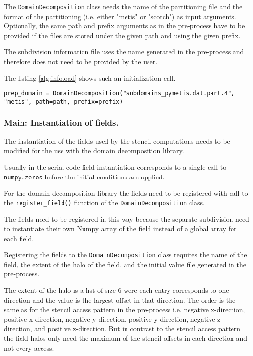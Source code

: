 The \texttt{DomainDecomposition} class needs the name of the partitioning file and the format of the partitioning (i.e. either "metis" or "scotch") as input arguments.
Optionally, the same path and prefix arguments as in the pre-process have to be provided if the files are stored under the given path and using the given prefix.

The subdivision information file uses the name generated in the pre-process and therefore does not need to be provided by the user.

The listing \ref{alg:infoload} shows such an initialization call.

\begin{lstlisting}[caption={Example code for the loading of the domain decomposition information.},captionpos=b, label={alg:infoload}]
prep_domain = DomainDecomposition("subdomains_pymetis.dat.part.4", "metis", path=path, prefix=prefix)
\end{lstlisting}

\subsubsection{Main: Instantiation of fields.}
The instantiation of the fields used by the stencil computations needs to be modified for the use with the domain decomposition library.

Usually in the serial code field instantiation corresponds to a single call to \texttt{numpy.zeros} before the initial conditions are applied.

For the domain decomposition library the fields need to be registered with call to the \texttt{register\_field()} function of the \texttt{DomainDecomposition} class.

The fields need to be registered in this way because the separate subdivision need to instantiate their own Numpy array of the field instead of a global array for each field.

Registering the fields to the \texttt{DomainDecomposition} class requires the name of the field, the extent of the halo of the field, and the initial value file generated in the pre-process.

The extent of the halo is a list of size 6 were each entry corresponds to one direction and the value is the largest offset in that direction.
The order is the same as for the stencil access pattern in the pre-process i.e. negative x-direction, positive x-direction, negative y-direction, positive y-direction, negative z-direction, and positive z-direction.
But in contrast to the stencil access pattern the field halos only need the maximum of the stencil offsets in each direction and not every access.

